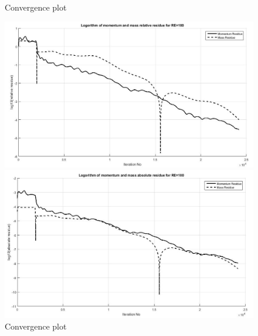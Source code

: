 \documentclass[12pt]{elsarticle}
\begin{document}
	
	\begin{figure}[h]
		\caption{Convergence plot}
		\centering\includegraphics[width=1.0\linewidth]{51_grid3_rr_re_100}
		\caption{Convergence plot}
		\centering\includegraphics[width=1.0\linewidth]{52_grid3_ar_re_100}
	\end{figure}
	
\end{document}
